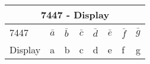 \documentclass{article}
\begin{document}
\label{table:2}
\begin{tabular}{|p{3cm}|p{1cm}|p{1cm}|p{1cm}|p{1cm}|p{1cm}|p{1cm}|p{1cm}|}                                           
	\hline                                                
	\multicolumn{8}{|c|}{7447 - Display}\\                                                                    
	\hline                                                
	7447& $\bar{a}$ & $\bar{b}$ & $\bar{c}$ & $\bar{d}$ & $\bar{e}$ & $\bar{f}$ & $\bar{g}$\\                                                                    
	\hline                                                
	Display& a& b& c& d& e& f& g\\                                                                            
	\hline                                        
\end{tabular}
\end{document}
